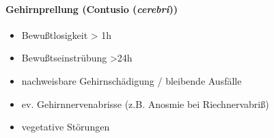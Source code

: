 \documentclass{article}
\begin{document}
\paragraph[Gehirnprellung (Contusio (cerebri))]{Gehirnprellung (Contusio
(\textit{cerebri}))}
\begin{itemize}
\item {\mdseries
Bewu{\ss}tlosigkeit  {\textgreater}  1h}

\item {\mdseries
Bewu{\ss}tseinstr\"ubung {\textgreater}24h}

\item {\mdseries
nachweisbare Gehirnsch\"adigung / bleibende  Ausf\"alle}

\item {\mdseries
ev. Gehirnnervenabrisse (z.B. Anosmie  bei  Riechnervabri{\ss})}

\item {\mdseries
 vegetative St\"orungen}

\end{itemize}
\end{document}
